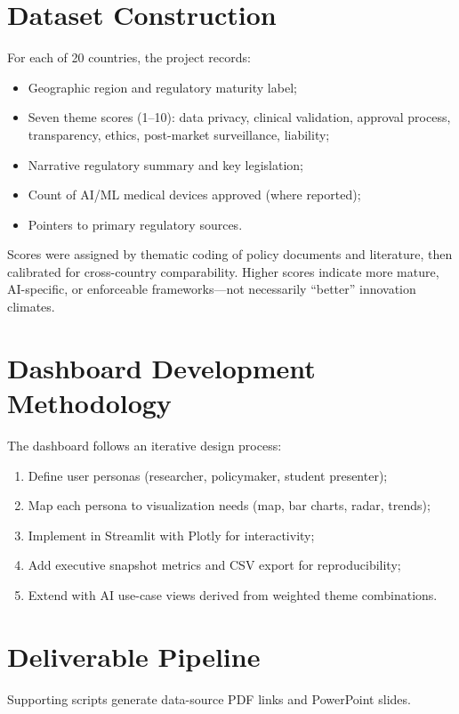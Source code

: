 \documentclass[12pt,a4paper]{report}
\begin{document}
\section{Dataset Construction}

For each of 20 countries, the project records:
\begin{itemize}[noitemsep]
  \item Geographic region and regulatory maturity label;
  \item Seven theme scores (1--10): data privacy, clinical validation, approval process, transparency, ethics, post-market surveillance, liability;
  \item Narrative regulatory summary and key legislation;
  \item Count of AI/ML medical devices approved (where reported);
  \item Pointers to primary regulatory sources.
\end{itemize}

Scores were assigned by thematic coding of policy documents and literature, then calibrated for cross-country comparability. Higher scores indicate more mature, AI-specific, or enforceable frameworks---not necessarily ``better'' innovation climates.

\section{Dashboard Development Methodology}

The dashboard follows an iterative design process:
\begin{enumerate}[noitemsep]
  \item Define user personas (researcher, policymaker, student presenter);
  \item Map each persona to visualization needs (map, bar charts, radar, trends);
  \item Implement in Streamlit with Plotly for interactivity;
  \item Add executive snapshot metrics and CSV export for reproducibility;
  \item Extend with AI use-case views derived from weighted theme combinations.
\end{enumerate}

\section{Deliverable Pipeline}

Supporting scripts generate data-source PDF links and PowerPoint slides.
\end{document}
